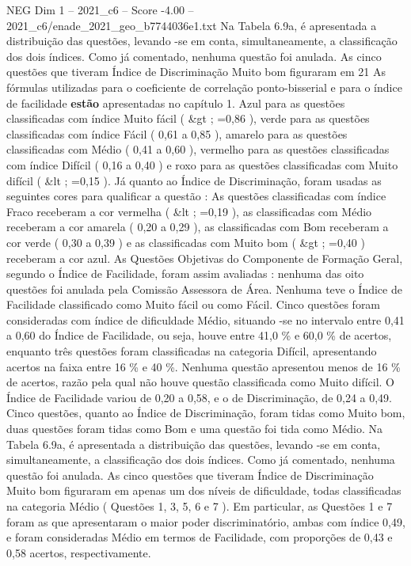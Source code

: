 \begin{textsample}{NEG Dim 1 – 2021\_c6 – Score -4.00 – 2021\_c6/enade\_2021\_geo\_b7744036e1.txt}
Na Tabela 6.9a, é apresentada a distribuição das questões, levando -se em conta, simultaneamente, a classificação dos dois índices.
Como já comentado, nenhuma questão foi anulada.
As cinco questões que tiveram Índice de Discriminação Muito bom figuraram em 21 As fórmulas utilizadas para o coeficiente de correlação ponto-bisserial e para o índice de facilidade \textbf{estão} apresentadas no capítulo 1.
Azul para as questões classificadas com índice Muito fácil ( \&gt ; =0,86 ), verde para as questões classificadas com índice Fácil ( 0,61 a 0,85 ), amarelo para as questões classificadas com Médio ( 0,41 a 0,60 ), vermelho para as questões classificadas com índice Difícil ( 0,16 a 0,40 ) e roxo para as questões classificadas com Muito difícil ( \&lt ; =0,15 ).
Já quanto ao Índice de Discriminação, foram usadas as seguintes cores para qualificar a questão : As questões classificadas com índice Fraco receberam a cor vermelha ( \&lt ; =0,19 ), as classificadas com Médio receberam a cor amarela ( 0,20 a 0,29 ), as classificadas com Bom receberam a cor verde ( 0,30 a 0,39 ) e as classificadas com Muito bom ( \&gt ; =0,40 ) receberam a cor azul.
As Questões Objetivas do Componente de Formação Geral, segundo o Índice de Facilidade, foram assim avaliadas : nenhuma das oito questões foi anulada pela Comissão Assessora de Área.
Nenhuma teve o Índice de Facilidade classificado como Muito fácil ou como Fácil.
Cinco questões foram consideradas com índice de dificuldade Médio, situando -se no intervalo entre 0,41 a 0,60 do Índice de Facilidade, ou seja, houve entre 41,0 \% e 60,0 \% de acertos, enquanto três questões foram classificadas na categoria Difícil, apresentando acertos na faixa entre 16 \% e 40 \%.
Nenhuma questão apresentou menos de 16 \% de acertos, razão pela qual não houve questão classificada como Muito difícil.
O Índice de Facilidade variou de 0,20 a 0,58, e o de Discriminação, de 0,24 a 0,49.
Cinco questões, quanto ao Índice de Discriminação, foram tidas como Muito bom, duas questões foram tidas como Bom e uma questão foi tida como Médio.
Na Tabela 6.9a, é apresentada a distribuição das questões, levando -se em conta, simultaneamente, a classificação dos dois índices.
Como já comentado, nenhuma questão foi anulada.
As cinco questões que tiveram Índice de Discriminação Muito bom figuraram em apenas um dos níveis de dificuldade, todas classificadas na categoria Médio ( Questões 1, 3, 5, 6 e 7 ).
Em particular, as Questões 1 e 7 foram as que apresentaram o maior poder discriminatório, ambas com índice 0,49, e foram consideradas Médio em termos de Facilidade, com proporções de 0,43 e 0,58 acertos, respectivamente.

\end{textsample}
